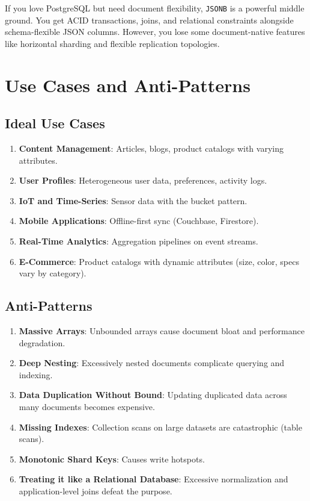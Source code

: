 \documentclass[12pt,a4paper]{article}
\begin{document}
\begin{rdbmsnote}
If you love PostgreSQL but need document flexibility, \texttt{JSONB} is a powerful middle ground. You get ACID transactions, joins, and relational constraints alongside schema-flexible JSON columns. However, you lose some document-native features like horizontal sharding and flexible replication topologies.
\end{rdbmsnote}

\section{Use Cases and Anti-Patterns}

\subsection{Ideal Use Cases}

\begin{enumerate}[noitemsep]
    \item \textbf{Content Management}: Articles, blogs, product catalogs with varying attributes.
    \item \textbf{User Profiles}: Heterogeneous user data, preferences, activity logs.
    \item \textbf{IoT and Time-Series}: Sensor data with the bucket pattern.
    \item \textbf{Mobile Applications}: Offline-first sync (Couchbase, Firestore).
    \item \textbf{Real-Time Analytics}: Aggregation pipelines on event streams.
    \item \textbf{E-Commerce}: Product catalogs with dynamic attributes (size, color, specs vary by category).
\end{enumerate}

\subsection{Anti-Patterns}

\begin{enumerate}[noitemsep]
    \item \textbf{Massive Arrays}: Unbounded arrays cause document bloat and performance degradation.
    \item \textbf{Deep Nesting}: Excessively nested documents complicate querying and indexing.
    \item \textbf{Data Duplication Without Bound}: Updating duplicated data across many documents becomes expensive.
    \item \textbf{Missing Indexes}: Collection scans on large datasets are catastrophic (table scans).
    \item \textbf{Monotonic Shard Keys}: Causes write hotspots.
    \item \textbf{Treating it like a Relational Database}: Excessive normalization and application-level joins defeat the purpose.
\end{enumerate}
\end{document}
